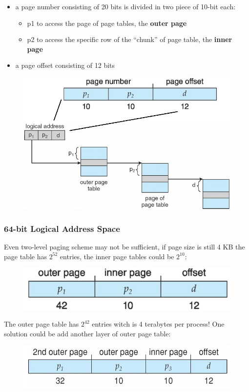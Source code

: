 \begin{itemize}
    \item a page number consisting of 20 bits is divided in two piece of 10-bit each:
    \begin{itemize}
        \item[] p1 to access the page of page tables, the \textbf{outer page}
        \item[] p2 to access the specific row of the “chunk” of page table, the \textbf{inner page}
    \end{itemize}
    \item a page offset consisting of 12 bits
\end{itemize}

\begin{figure}[h!]
    \centering
    \includegraphics[width=0.65\linewidth]{img/mu.png}
\end{figure}


\subsubsection{64-bit Logical Address Space}

Even two-level paging scheme may not be sufficient, if page size is still 4 KB the page table has $2^{52}$ entries, the inner page tables could be $2^{10}$:

\begin{figure}[h!]
    \centering
    \includegraphics[width=0.5\linewidth]{img/ndg.png}
\end{figure}

The outer page table has $2^{42}$ entries witch is 4 terabytes per process! One solution could be add another layer of outer page table:

\begin{figure}[h!]
    \centering
    \includegraphics[width=0.65\linewidth]{img/db.png}
\end{figure}

